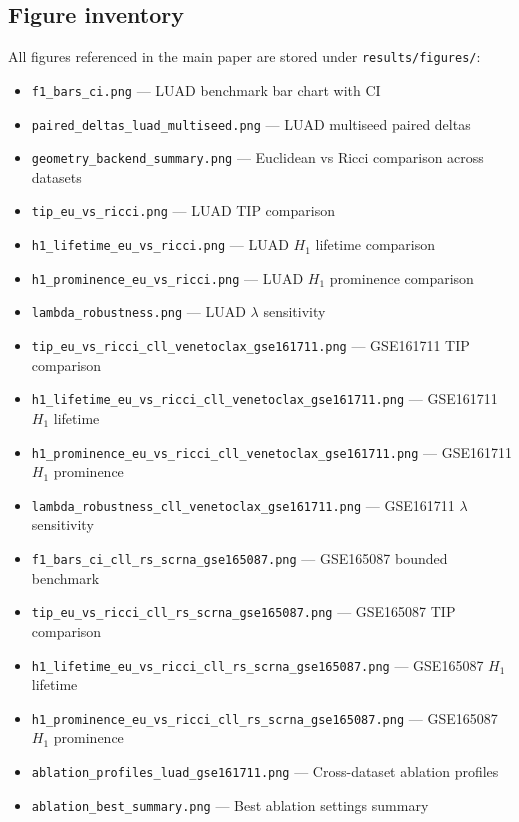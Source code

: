 \documentclass[11pt]{article}
\begin{document}
\subsection{Figure inventory}
All figures referenced in the main paper are stored under \texttt{results/figures/}:
\begin{itemize}[leftmargin=1.5em]
\item \texttt{f1\_bars\_ci.png} --- LUAD benchmark bar chart with CI
\item \texttt{paired\_deltas\_luad\_multiseed.png} --- LUAD multiseed paired deltas
\item \texttt{geometry\_backend\_summary.png} --- Euclidean vs Ricci comparison across datasets
\item \texttt{tip\_eu\_vs\_ricci.png} --- LUAD TIP comparison
\item \texttt{h1\_lifetime\_eu\_vs\_ricci.png} --- LUAD $H_1$ lifetime comparison
\item \texttt{h1\_prominence\_eu\_vs\_ricci.png} --- LUAD $H_1$ prominence comparison
\item \texttt{lambda\_robustness.png} --- LUAD $\lambda$ sensitivity
\item \texttt{tip\_eu\_vs\_ricci\_cll\_venetoclax\_gse161711.png} --- GSE161711 TIP comparison
\item \texttt{h1\_lifetime\_eu\_vs\_ricci\_cll\_venetoclax\_gse161711.png} --- GSE161711 $H_1$ lifetime
\item \texttt{h1\_prominence\_eu\_vs\_ricci\_cll\_venetoclax\_gse161711.png} --- GSE161711 $H_1$ prominence
\item \texttt{lambda\_robustness\_cll\_venetoclax\_gse161711.png} --- GSE161711 $\lambda$ sensitivity
\item \texttt{f1\_bars\_ci\_cll\_rs\_scrna\_gse165087.png} --- GSE165087 bounded benchmark
\item \texttt{tip\_eu\_vs\_ricci\_cll\_rs\_scrna\_gse165087.png} --- GSE165087 TIP comparison
\item \texttt{h1\_lifetime\_eu\_vs\_ricci\_cll\_rs\_scrna\_gse165087.png} --- GSE165087 $H_1$ lifetime
\item \texttt{h1\_prominence\_eu\_vs\_ricci\_cll\_rs\_scrna\_gse165087.png} --- GSE165087 $H_1$ prominence
\item \texttt{ablation\_profiles\_luad\_gse161711.png} --- Cross-dataset ablation profiles
\item \texttt{ablation\_best\_summary.png} --- Best ablation settings summary
\end{itemize}
\end{document}
